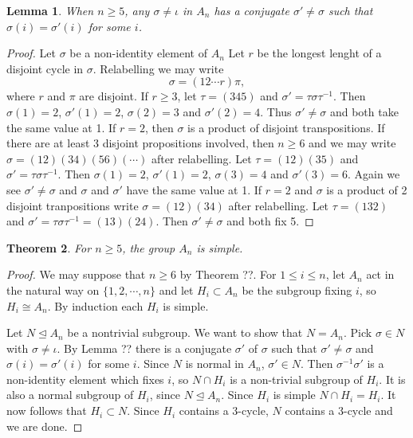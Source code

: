 \documentclass[a4paper,10pt]{article}
\newtheorem{theorem}{Theorem}[section]
\newtheorem{lemma}[theorem]{Lemma}
\theoremstyle{definition}
\begin{document}
\begin{lemma}
When $n\geq 5$, any $\sigma \neq \iota$ in $A_n$ has a conjugate $\sigma'\neq\sigma$ such that $\sigma(i)=\sigma'(i)$ for some $i$.  
\end{lemma}
\begin{proof}
Let $\sigma$ be a non-identity element of $A_n$ Let $r$ be the longest lenght of a disjoint cycle in $\sigma$. Relabelling we may write
\begin{equation}
\sigma = (12\cdots r)\pi, 
\end{equation}
where $r$ and $\pi$ are disjoint. If $r\geq 3$, let $\tau = (345)$ and $\sigma'=\tau\sigma\tau^{-1}$. Then $\sigma(1)=2$, $\sigma'(1)=2$, $\sigma(2)=3$ and $\sigma'(2)=4$. Thus $\sigma'\neq\sigma$ and both take the same value at 1. If $r=2$, then $\sigma$ is a product of disjoint transpositions. If there are at least 3 disjoint propositions involved, then $n\geq 6$ and we may write $\sigma = (12)(34)(56)(\cdots)$ after relabelling. Let $\tau=(12)(35)$ and $\sigma'=\tau\sigma\tau^{-1}$. Then $\sigma(1)=2$, $\sigma'(1)=2$, $\sigma(3) = 4$ and $\sigma'(3) = 6$. Again we see $\sigma'\neq \sigma$ and $\sigma$ and $\sigma'$ have the same value at 1. If $r=2$ and $\sigma$ is a product of 2 disjoint tranpositions write $\sigma = (12)(34)$ after relabelling. Let $\tau = (132)$ and $\sigma'=\tau\sigma\tau^{-1}=(13)(24)$. Then $\sigma'\neq \sigma$ and both fix 5.

\end{proof}


\begin{theorem}
For $n\geq 5$, the group $A_n$ is simple. 
\end{theorem}
\begin{proof}
We may suppose that $n \geq 6$ by Theorem ??. For $1 \leq i\leq n$, let $A_n$ act in the natural way on $\{1, 2, \cdots,n\}$ and let $H_i\subset A_n$ be the subgroup fixing $i$, so $H_i \cong A_n$. By induction each $H_i$ is simple.

Let $N \unlhd A_n$ be a nontrivial subgroup. We want to show that $N=A_n$. Pick $\sigma \in N$ with $\sigma \neq \iota$. By Lemma ?? there is a conjugate $\sigma'$ of $\sigma$ such that $\sigma' \neq \sigma$ and $\sigma(i)=\sigma'(i)$ for some $i$. Since $N$ is normal in $A_n$, $\sigma' \in N$. Then $\sigma^{-1}\sigma'$ is a non-identity element which fixes $i$, so $N \cap H_i$ is a non-trivial subgroup of $H_i$. It is also a normal subgroup of $H_i$, since $N \unlhd A_n$. Since $H_i$ is simple $N\cap H_i = H_i$. It now follows that $H_i \subset N$. Since $H_i$ contains a 3-cycle, $N$ contains a 3-cycle and we are done.
\end{proof}
\end{document}
